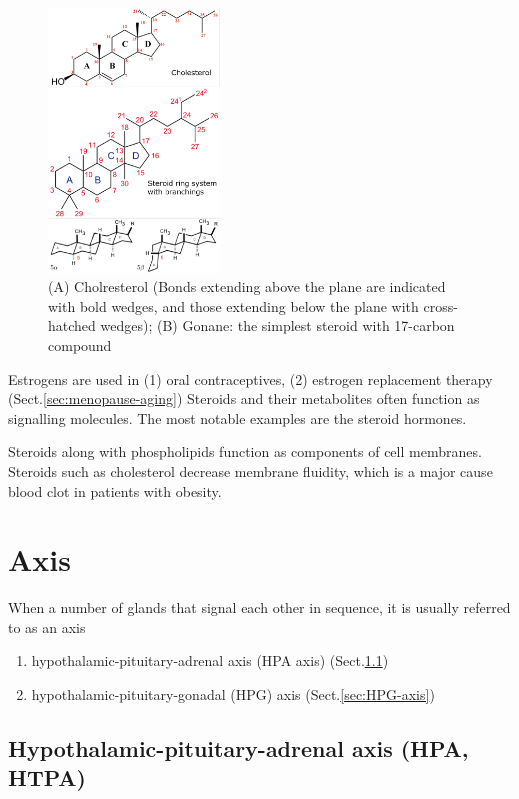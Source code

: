 \begin{figure}[htb]
\centerline{\includegraphics[height=7cm]{./images/Steroid.eps}}
\caption{(A) Cholresterol (Bonds extending above the plane are indicated with
bold wedges, and those extending below the plane with cross-hatched wedges); (B)
Gonane: the simplest steroid with 17-carbon compound}
\label{fig:Steroid}
\end{figure} 

Estrogens are used in (1) oral contraceptives, (2) estrogen replacement therapy
(Sect.\ref{sec:menopause-aging})
Steroids and their metabolites often function as signalling molecules. The most
notable examples are the steroid hormones.

Steroids along with phospholipids function as components of cell membranes. 
Steroids such as cholesterol decrease membrane fluidity, which is a major cause
blood clot in patients with obesity.



\section{Axis}
\label{sec:axis-gland-sequence}

When a number of glands that signal each other in sequence, it is usually
referred to as an axis
\begin{enumerate}
  \item hypothalamic-pituitary-adrenal axis (HPA axis) (Sect.\ref{sec:HPA-axis})
  
   \item hypothalamic-pituitary-gonadal (HPG) axis (Sect.\ref{sec:HPG-axis})
\end{enumerate}

\subsection{Hypothalamic-pituitary-adrenal axis (HPA, HTPA)}
\label{sec:HPA-axis}

